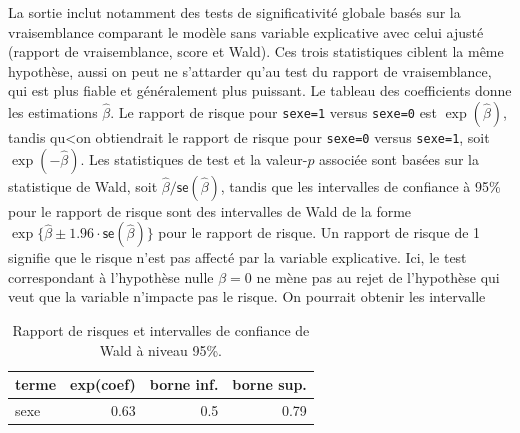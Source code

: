 \documentclass[
  11pt,
  letterpaper,
]{scrbook}
\theoremstyle{definition}
\theoremstyle{remark}
\begin{document}
La sortie inclut notamment des tests de significativité globale basés
sur la vraisemblance comparant le modèle sans variable explicative avec
celui ajusté (rapport de vraisemblance, score et Wald). Ces trois
statistiques ciblent la même hypothèse, aussi on peut ne s'attarder
qu'au test du rapport de vraisemblance, qui est plus fiable et
généralement plus puissant. Le tableau des coefficients donne les
estimations \(\widehat{\beta}\). Le rapport de risque pour
\texttt{sexe=1} versus \texttt{sexe=0} est \(\exp(\widehat{\beta})\),
tandis qu\textless on obtiendrait le rapport de risque pour
\texttt{sexe=0} versus \texttt{sexe=1}, soit \(\exp(-\widehat{\beta})\).
Les statistiques de test et la valeur-\(p\) associée sont basées sur la
statistique de Wald, soit
\(\widehat{\beta}/\mathsf{se}(\widehat{\beta})\), tandis que les
intervalles de confiance à 95\% pour le rapport de risque sont des
intervalles de Wald de la forme
\(\exp\{\widehat{\beta} \pm 1.96 \cdot \mathsf{se}(\widehat{\beta})\}\)
pour le rapport de risque. Un rapport de risque de 1 signifie que le
risque n'est pas affecté par la variable explicative. Ici, le test
correspondant à l'hypothèse nulle \(\beta=0\) ne mène pas au rejet de
l'hypothèse qui veut que la variable n'impacte pas le risque. On
pourrait obtenir les intervalle

\hypertarget{tbl-cox1}{}
\begin{table}
\caption{\label{tbl-cox1}Rapport de risques et intervalles de confiance de Wald à niveau 95\%. }\tabularnewline

\centering
\begin{tabular}{lrrr}
\toprule
terme & exp(coef) & borne inf. & borne sup.\\
\midrule
sexe & 0.63 & 0.5 & 0.79\\
\bottomrule
\end{tabular}
\end{table}
\end{document}
